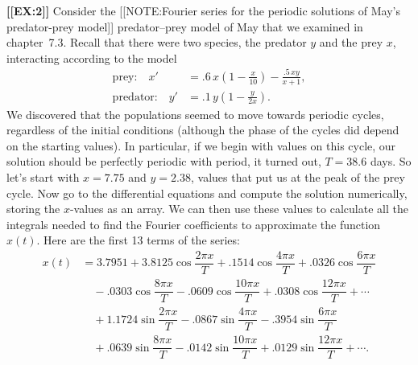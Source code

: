 \begin{center}
\end{center}





{\bf [[EX:2]]}\quad\label{May Fourier} Consider the 
[[NOTE:Fourier series for the periodic solutions of May's predator-prey model]] 
predator--prey model of May that
we examined in chapter~7.3.  Recall that there were two species, the
predator $y$ and the prey $x$, interacting according to the model
\begin{align*}
\mbox{prey:} \quad x' 
   &= .6\,x\left(1-\frac{x}{10}\right) - \frac{.5\,xy}{x+1}, \\
\mbox{predator:} \quad y' 
   &= .1\,y\left(1-\frac{y}{2x}\right).
\end{align*}
We discovered that the populations seemed to move towards periodic
cycles, regardless of the initial conditions (although the phase of
the cycles did depend on the starting values).  In particular, if we
begin with values on this cycle, our solution should be perfectly
periodic with period, it turned out, $T=38.6$ days.  So let's start
with $x=7.75$ and $y=2.38$, values that put us at the peak of the prey
cycle.  Now go to the differential equations and compute the solution
numerically, storing the $x$-values as an array. We can then use these
values to calculate all the integrals needed to find the Fourier
coefficients to approximate the function $x(t)$.  Here are the first
13 terms of the series:
\begin{align*}
x(t)&= 3.7951 + 3.8125\cos\dfrac{2\pi x}{T} + .1514\cos\dfrac{4\pi x}{T}
           + .0326\cos\dfrac{6\pi x}{T} \\[6pt]
 & \mbox{}\quad - .0303\cos\dfrac{8\pi x}{T} 
      - .0609\cos\dfrac{10\pi x}{T}+.0308\cos\dfrac{12\pi x}{T} 
      + \cdots \\[8pt]
 & \mbox{}\quad + 1.1724\sin\dfrac{2\pi x}{T}
      - .0867\sin\dfrac{4\pi x}{T}-.3954\sin\dfrac{6\pi x}{T} \\[8pt]
 & \mbox{}\quad + .0639\sin\dfrac{8\pi x}{T}
      - .0142\sin\dfrac{10\pi x}{T}+.0129\sin\dfrac{12\pi x}{T} 
      + \cdots .
\end{align*}


